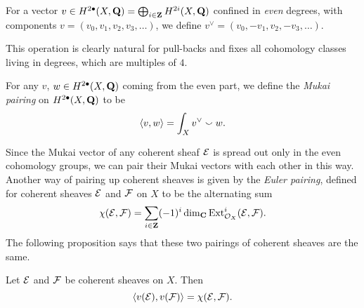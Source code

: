\begin{definition}
    \label{Definition of v vee}
    For a vector $v \in H^{2\bullet}(X, \mathbf Q) = \bigoplus_{i \in \mathbf Z} H^{2i}(X, \mathbf Q)$ confined in \emph{even} degrees, with components $v = (v_0, v_1, v_2, v_3, \dots)$, we define $v^\vee = (v_0, -v_1, v_2, -v_3, \dots)$.
\end{definition}

This operation is clearly natural for pull-backs and fixes all cohomology classes living in degrees, which are multiples of $4$.  

\begin{definition}
    \label{Definition of Mukai pairing}
    For any $v$, $w \in H^{2\bullet}(X, \mathbf Q)$ coming from the even part, we define the \emph{Mukai pairing} on $H^{2\bullet}(X, \mathbf Q)$ to be
    \[
        \langle v, w \rangle = \int_X v^\vee \smallsmile w.
    \]
\end{definition}

Since the Mukai vector of any coherent sheaf $\mathcal E$ is spread out only in the even cohomology groups, we can pair their Mukai vectors with each other in this way. Another way of pairing up coherent sheaves is given by the \emph{Euler pairing}, defined for coherent sheaves $\mathcal E$ and $\mathcal F$ on $X$ to be the alternating sum
\begin{equation}
    \label{Euler pairing}
    \chi(\mathcal E, \mathcal F) = \sum_{i \in \mathbf Z} (-1)^i \dim_\mathbf C \operatorname{Ext}^i_{\mathcal{O}_{X}}(\mathcal E, \mathcal F).
\end{equation}
The following proposition says that these two pairings of coherent sheaves are the same.

\begin{proposition}
    \label{equler pairing = mukai pairing}
    \emph{\cite[\S I, Lemma 3.1.7]{caldararu2000derived}}
    Let $\mathcal E$ and $\mathcal F$ be coherent sheaves on $X$. Then
    \begin{equation}
        \label{eq: euler pairing = mukai pairing}
        \langle v(\mathcal E), v(\mathcal F) \rangle = \chi(\mathcal E, \mathcal F).
    \end{equation}
\end{proposition}

